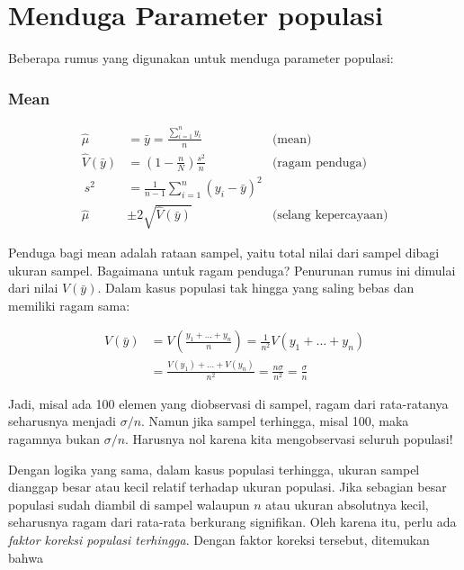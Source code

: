 \documentclass[
  letterpaper,
  DIV=11,
  numbers=noendperiod]{scrreprt}
\begin{document}
\hypertarget{menduga-parameter-populasi}{%
\section{Menduga Parameter populasi}\label{menduga-parameter-populasi}}

Beberapa rumus yang digunakan untuk menduga parameter populasi:

\hypertarget{mean}{%
\subsubsection{Mean}\label{mean}}

\[
\begin{aligned}
\hat{\mu}&=\bar{y}=\frac{\sum_{i=1}^n y_i}{n} & \text{(mean)}\\
\hat{V}(\bar{y})&=\left(1-\frac{n}{N}\right)\frac{s^2}{n}&\text{(ragam penduga)}\\\
s^2&=\frac{1}{n-1}\sum_{i=1}^n(y_i-\bar{y})^2 &\\
\hat{\mu}&\pm2\sqrt{\hat{V}(\bar{y})} & \text{(selang kepercayaan)}
\end{aligned}
\]

Penduga bagi mean adalah rataan sampel, yaitu total nilai dari sampel
dibagi ukuran sampel. Bagaimana untuk ragam penduga? Penurunan rumus ini
dimulai dari nilai \(V\left(\bar{y}\right)\). Dalam kasus populasi tak
hingga yang saling bebas dan memiliki ragam sama:

\[
\begin{aligned}
V\left(\bar{y}\right)&=V\left(\frac{y_1+\ldots+y_n}{n}\right)=\frac{1}{n^2}V(y_1+\ldots+y_n)\\ 
&=\frac{V(y_1)+\ldots+V(y_n)}{n^2}=\frac{n\sigma}{n^2}=\frac{\sigma}{n}
\end{aligned}
\]

Jadi, misal ada 100 elemen yang diobservasi di sampel, ragam dari
rata-ratanya seharusnya menjadi \(\sigma/n\). Namun jika sampel
terhingga, misal 100, maka ragamnya bukan \(\sigma/n\). Harusnya nol
karena kita mengobservasi seluruh populasi!

Dengan logika yang sama, dalam kasus populasi terhingga, ukuran sampel
dianggap besar atau kecil relatif terhadap ukuran populasi. Jika
sebagian besar populasi sudah diambil di sampel walaupun \(n\) atau
ukuran absolutnya kecil, seharusnya ragam dari rata-rata berkurang
signifikan. Oleh karena itu, perlu ada \emph{faktor koreksi populasi
terhingga}. Dengan faktor koreksi tersebut, ditemukan bahwa
\end{document}
